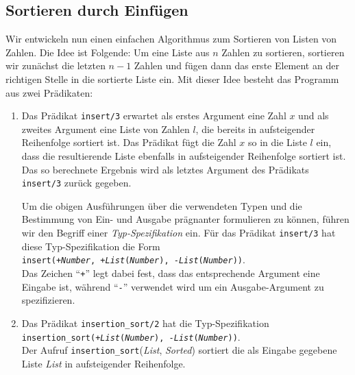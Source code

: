 \subsection{Sortieren durch Einf\"{u}gen}
Wir entwickeln nun einen einfachen Algorithmus zum Sortieren von Listen von Zahlen.
Die Idee ist Folgende:  Um eine Liste aus $n$ Zahlen zu sortieren, sortieren wir zun\"{a}chst
die letzten $n-1$ Zahlen und f\"{u}gen dann das erste Element an der richtigen Stelle in die sortierte
Liste ein.  Mit dieser Idee besteht das Programm aus zwei Pr\"{a}dikaten:
\begin{enumerate}
\item Das Pr\"{a}dikat \texttt{insert/3} erwartet
      als erstes Argument eine Zahl $x$ und als zweites Argument eine Liste von Zahlen $l$,
      die bereits in aufsteigender Reihenfolge sortiert ist.  
      Das Pr\"{a}dikat f\"{u}gt die Zahl $x$ so in die Liste $l$ ein, dass die resultierende Liste
      ebenfalls in aufsteigender Reihenfolge sortiert ist. Das so berechnete Ergebnis
      wird als letztes Argument des Pr\"{a}dikats \texttt{insert/3} zur\"{u}ck gegeben.  

      Um die obigen Ausf\"{u}hrungen
      \"{u}ber die verwendeten Typen und die Bestimmung von Ein- und Ausgabe pr\"{a}gnanter
      formulieren zu k\"{o}nnen, f\"{u}hren wir den Begriff einer \emph{Typ-Spezifikation} ein.
      F\"{u}r das Pr\"{a}dikat \texttt{insert/3} hat diese Typ-Spezifikation die Form \\[0.2cm]
      \hspace*{1.3cm} 
      \texttt{insert(+\textsl{Number}, +\textsl{List}(\textsl{Number}), -\textsl{List}(\textsl{Number}))}.
      \\[0.2cm]
      Das Zeichen ``\texttt{+}'' legt dabei fest, dass das entsprechende
      Argument eine Eingabe ist, w\"{a}hrend ``\texttt{-}'' verwendet wird um ein
      Ausgabe-Argument zu spezifizieren.
\item Das Pr\"{a}dikat \texttt{insertion\_sort/2} hat die Typ-Spezifikation \\[0.2cm]
      \hspace*{1.3cm} \texttt{insertion\_sort(+\textsl{List}(\textsl{Number}), -\textsl{List}(\textsl{Number}))}.
      \\[0.2cm]
      Der Aufruf \texttt{insertion\_sort}(\textsl{List}, \textsl{Sorted}) sortiert die als Eingabe
      gegebene Liste \textsl{List} in aufsteigender Reihenfolge.
\end{enumerate}


